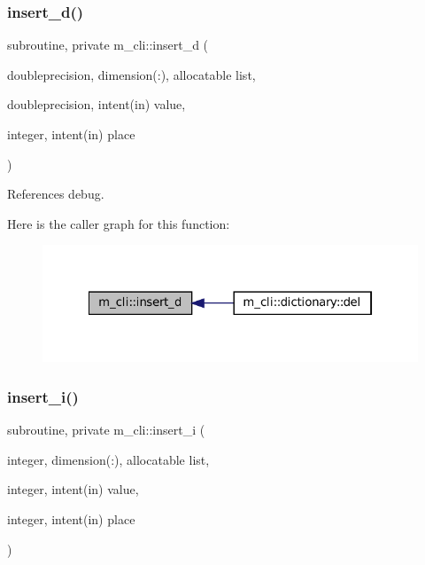 \subsubsection{\texorpdfstring{insert\+\_\+d()}{insert\_d()}}
{\footnotesize\ttfamily subroutine, private m\+\_\+cli\+::insert\+\_\+d (\begin{DoxyParamCaption}\item[{doubleprecision, dimension(\+:), allocatable}]{list,  }\item[{doubleprecision, intent(in)}]{value,  }\item[{integer, intent(in)}]{place }\end{DoxyParamCaption})\hspace{0.3cm}{\ttfamily [private]}}



References debug.

Here is the caller graph for this function\+:
\nopagebreak
\begin{figure}[H]
\begin{center}
\leavevmode
\includegraphics[width=322pt]{namespacem__cli_a030e31579a7968aea68d80db1e36ebfd_icgraph}
\end{center}
\end{figure}
\mbox{\label{namespacem__cli_a841685591ef1f1827fc1fe32a7f546f1}} 
\subsubsection{\texorpdfstring{insert\+\_\+i()}{insert\_i()}}
{\footnotesize\ttfamily subroutine, private m\+\_\+cli\+::insert\+\_\+i (\begin{DoxyParamCaption}\item[{integer, dimension(\+:), allocatable}]{list,  }\item[{integer, intent(in)}]{value,  }\item[{integer, intent(in)}]{place }\end{DoxyParamCaption})\hspace{0.3cm}{\ttfamily [private]}}




